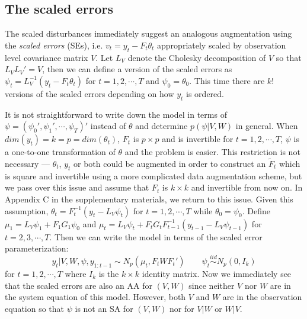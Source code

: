 \documentclass[12pt]{article}
\begin{document}
\subsection{The scaled errors}\label{sec:DAs:error}
The scaled disturbances immediately suggest an analogous augmentation using the {\it scaled errors} (SEs), i.e. $v_t=y_t - F_t\theta_t$ appropriately scaled by observation level covariance matrix $V$. Let $L_V$ denote the Cholesky decomposition of $V$ so that $L_VL_V'=V$, then we can define a version of the scaled errors as $\psi_t = L_V^{-1}(y_t - F_t\theta_t)$ for $t=1,2,\cdots,T$ and $\psi_0 = \theta_0$. This time there are $k!$ versions of the scaled errors depending on how $y_t$ is ordered.

It is not straightforward to write down the model in terms of $\psi=(\psi_0',\psi_1',\cdots,\psi_T)'$ instead of $\theta$ and determine $p(\psi|V,W)$ in general. When $dim(y_t)=k=p=dim(\theta_t)$, $F_t$ is $p\times p$ and is invertible for $t=1,2,\cdots,T$, $\psi$ is a one-to-one transformation of $\theta$ and the problem is easier. This restriction is not necessary --- $\theta_t$, $y_t$ or both could be augmented in order to construct an $\tilde{F}_t$ which is square and invertible using a more complicated data augmentation scheme, but we pass over this issue and assume that $F_t$ is $k\times k$ and invertible from now on. In Appendix C in the supplementary materials, we return to this issue. Given this assumption, $\theta_t = F_t^{-1}(y_t - L_V\psi_t)$ for $t=1,2,\cdots,T$ while $\theta_0=\psi_0$. Define $\mu_1 = L_V\psi_1 + F_1G_1\psi_0$ and $\mu_t =L_V\psi_t + F_tG_tF_{t-1}^{-1}(y_{t-1} - L_{V}\psi_{t-1})$ for $t=2,3,\cdots,T$. Then we can write the model in terms of the scaled error parameterization:
\begin{equation*}
  y_t|V,W,\psi,y_{1:t-1} \sim N_p(\mu_t, F_tWF_t') \qquad
  \psi_t  \stackrel{iid}{\sim} N_p(0,I_k)
\end{equation*}
for $t=1,2,\cdots,T$ where $I_k$ is the $k\times k$ identity matrix. Now we immediately see that the scaled errors are also an AA for $(V,W)$ since neither $V$ nor $W$ are in the system equation of this model. However, both $V$ and $W$ are in the observation equation so that $\psi$ is not an SA for $(V,W)$ nor for $V|W$ or $W|V$.
\end{document}
